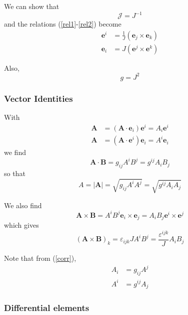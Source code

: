 We can show that 
\begin{equation}
\mathcal{J}=J^{-1}
\end{equation}
and the relations (\ref{rel1}-\ref{rel2}) become 
\begin{align}
\mathbf{e}^{i} & =\frac{1}{J}\left( \mathbf{e}_{j}\times\mathbf{e}_{k}\right)
\\
\mathbf{e}_{i} & =J\left( \mathbf{e}^{j}\times\mathbf{e}^{k}\right)
\end{align}

Also, 
\begin{equation}
g=J^{2}
\end{equation}

\subsubsection{Vector Identities}

With 
\begin{align}
\mathbf{A} & =\left( \mathbf{A}\cdot\mathbf{e}_{i}\right) \mathbf{e}%
^{i}=A_{i}\mathbf{e} ^{i} \\
\mathbf{A} & =\left( \mathbf{A}\cdot\mathbf{e}^{i}\right) \mathbf{e}%
_{i}=A^{i}\mathbf{e} _{i}
\end{align}
we find 
\begin{equation}
\mathbf{A}\cdot\mathbf{B}=g_{ij}A^{i}B^{j}=g^{ij}A_{i}B_{j}
\end{equation}
so that 
\begin{equation}
A=\left| \mathbf{A}\right| =\sqrt{g_{ij}A^{i}A^{j}}=\sqrt{g^{ij}A_{i}A_{j}}
\end{equation}

We also find 
\begin{equation}
\mathbf{A}\times\mathbf{B}=A^{i}B^{j}\mathbf{e}_{i}\times\mathbf{e}%
_{j}=A_{i}B_{j}\mathbf{e}^{i}\times\mathbf{e}^{j}
\end{equation}
which gives 
\begin{equation}
\left( \mathbf{A}\times\mathbf{B}\right) _{k}=\varepsilon_{ijk}JA^{i}B^{j}=%
\frac{ \varepsilon^{ijk}}{J}A_{i}B_{j}
\end{equation}

Note that from (\ref{corr}), 
\begin{align}
A_{i} & =g_{ij}A^{j} \\
A^{i} & =g^{ij}A_{j}
\end{align}

\subsubsection{Differential elements}

